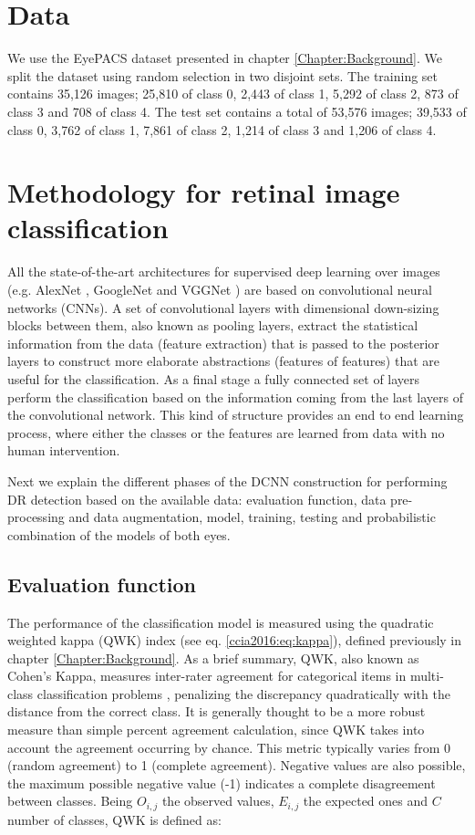 \section{Data}

We use the EyePACS dataset presented in chapter \ref{Chapter:Background}. We split the dataset using random selection in two disjoint sets. The training set contains 35,126 images; 25,810 of class 0, 2,443 of class 1, 5,292 of class 2, 873 of class 3 and 708 of class 4. The test set contains a total of 53,576 images; 39,533 of class 0, 3,762 of class 1, 7,861 of class 2, 1,214 of class 3 and 1,206 of class 4.


\section{Methodology for retinal image classification}

All the state-of-the-art architectures for supervised deep learning over images (e.g. AlexNet \citep{Krizhevsky:2012}, GoogleNet \citep{googlenet} and VGGNet \citep{vggnet}) are based on convolutional neural networks (CNNs). A set of convolutional layers with dimensional down-sizing blocks between them, also known as pooling layers, extract the statistical information from the data (feature extraction) that is passed to the posterior layers to construct more elaborate abstractions (features of features) that are useful for the classification. As a final stage a fully connected set of layers perform the classification based on the information coming from the last layers of the convolutional network. This kind of structure provides an end to end learning process, where either the classes or the features are learned from data with no human intervention.

Next we explain the different phases of the DCNN construction for performing DR detection based on the available data: evaluation function, data pre-processing and data augmentation, model, training, testing and probabilistic combination of the models of both eyes.

\subsection{Evaluation function}

The performance of the classification model is measured using the quadratic weighted kappa  (QWK) index  (see eq. \ref{ccia2016:eq:kappa}), defined previously in chapter \ref{Chapter:Background}. As a brief summary, QWK, also known as Cohen's Kappa, measures inter-rater agreement for categorical items in multi-class classification problems \citep{kappa}, penalizing the discrepancy quadratically with the distance from the correct class. It is generally thought to be a more robust measure than simple percent agreement calculation, since QWK takes into account the agreement occurring by chance. This metric typically varies from 0 (random agreement) to 1 (complete agreement). Negative values are also possible, the maximum possible negative value (-1) indicates a complete disagreement between classes.
Being $O_{i,j}$ the observed values, $E_{i,j}$ the expected ones and $C$ number of classes, QWK is defined as:

